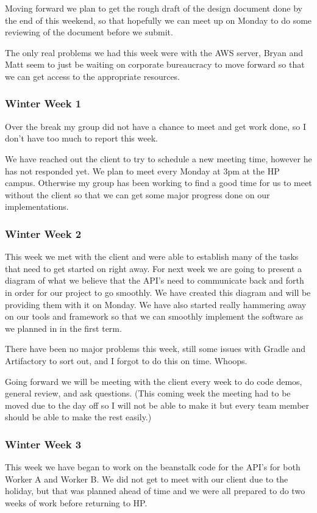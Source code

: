 \documentclass[onecolumn, draftclsnofoot,10pt, compsoc]{IEEEtran}
\begin{document}
Moving forward we plan to get the rough draft of the design document done by the end of this weekend, so that hopefully we can meet up on Monday to do some reviewing of the document before we submit.

The only real problems we had this week were with the AWS server, Bryan and Matt seem to just be waiting on corporate bureaucracy to move forward so that we can get access to the appropriate resources.

\subsubsection*{Winter Week 1}
Over the break my group did not have a chance to meet and get work done, so I don't have too much to report this week.

We have reached out the client to try to schedule a new meeting time, however he has not responded yet. We plan to meet every Monday at 3pm at the HP campus. Otherwise my group has been working to find a good time for us to meet without the client so that we can get some major progress done on our implementations.

\subsubsection*{Winter Week 2}
This week we met with the client and were able to establish many of the tasks that need to get started on right away. For next week we are going to present a diagram of what we believe that the API's need to communicate back and forth in order for our project to go smoothly. We have created this diagram and will be providing them with it on Monday. We have also started really hammering away on our tools and framework so that we can smoothly implement the software as we planned in in the first term.

There have been no major problems this week, still some issues with Gradle and Artifactory to sort out, and I forgot to do this on time. Whoops.

Going forward we will be meeting with the client every week to do code demos, general review, and ask questions. (This coming week the meeting had to be moved due to the day off so I will not be able to make it but every team member should be able to make the rest easily.)

\subsubsection*{Winter Week 3}
This week we have began to work on the beanstalk code for the API's for both Worker A and Worker B. We did not get to meet with our client due to the holiday, but that was planned ahead of time and we were all prepared to do two weeks of work before returning to HP.
\end{document}
